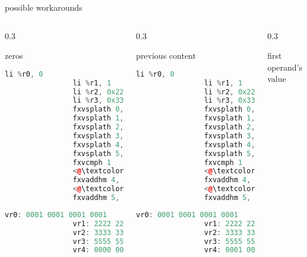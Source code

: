 \documentclass[10pt]{beamer}
\begin{document}
\begin{frame}[fragile]{possible workarounds}{}
	\begin{columns}[t]
		\begin{column}{0.3\textwidth}
			\begin{block}{zeros}
			\begin{lstlisting}[language=C++,basicstyle=\ttfamily\scriptsize,keywordstyle=\color{red}]
				li %r0, 0
				li %r1, 1
				li %r2, 0x2222
				li %r3, 0x3333
				fxvsplath 0, %r0
				fxvsplath 1, %r1
				fxvsplath 2, %r2
				fxvsplath 3, %r3
				fxvsplath 4, %r1
				fxvsplath 5, %r1
				fxvcmph 1
				<@\textcolor{red}{fxvaddhm 4, 0, 0, 0}@>
				fxvaddhm 4, 2, 1, 1
				<@\textcolor{red}{fxvaddhm 5, 0, 0, 0}@>
				fxvaddhm 5, 3, 3, 2
			\end{lstlisting}
      		\begin{lstlisting}[language=C++,basicstyle=\fontsize{5}{7}\selectfont\ttfamily,keywordstyle=\color{red}]
				vr0: 0001 0001 0001 0001
				vr1: 2222 2222 2222 2222
				vr2: 3333 3333 3333 3333
				vr3: 5555 5555 5555 5555
				vr4: 0000 0000 0000 0000
			\end{lstlisting}
			\end{block}
    	\end{column}
    	\begin{column}{0.3\textwidth}
    		\begin{block}{previous content}
    		\begin{lstlisting}[language=C++,basicstyle=\ttfamily\scriptsize,keywordstyle=\color{red}]
				li %r0, 0
				li %r1, 1
				li %r2, 0x2222
				li %r3, 0x3333
				fxvsplath 0, %r0
				fxvsplath 1, %r1
				fxvsplath 2, %r2
				fxvsplath 3, %r3
				fxvsplath 4, %r1
				fxvsplath 5, %r1
				fxvcmph 1
				<@\textcolor{red}{fxvaddhm 4, 4, 0, 0}@>
				fxvaddhm 4, 2, 1, 1
				<@\textcolor{red}{fxvaddhm 5, 5, 0, 0}@>
				fxvaddhm 5, 3, 3, 2
	\end{lstlisting}
      			\begin{lstlisting}[language=C++,basicstyle=\fontsize{5}{7}\selectfont\ttfamily,keywordstyle=\color{red}]
				vr0: 0001 0001 0001 0001
				vr1: 2222 2222 2222 2222
				vr2: 3333 3333 3333 3333
				vr3: 5555 5555 5555 5555
				vr4: 0001 0001 0001 0001
				\end{lstlisting}
			\end{block}
    	\end{column}
    	\begin{column}{0.3\textwidth}
    		\begin{block}{first operand's value}

\end{block}
\end{column}
\end{columns}
\end{frame}
\end{document}
